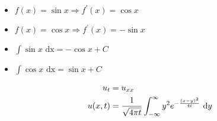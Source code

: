 \documentclass{article}
\begin{document}
\begin{multicols}{2}
\begin{itemize}
  \item $f(x) = \sin x \Rightarrow f^\prime(x) =   \cos x$
  \item $f(x) = \cos x \Rightarrow f^\prime(x) = - \sin x$
  \item $\int \sin x \text{ dx} = - \cos x + C$
  \item $\int \cos x \text{ dx} =   \sin x + C$
\end{itemize}

%
\begin{align}
  u_t & = u_{xx}\\
  u(x, t)
  & = \frac{1}{\sqrt{4 \pi t}} \int^\infty_{-\infty}
  y^2 e^{-\frac{(x - y)^2}{4t}}\ \text dy
\end{align}

\end{multicols}
\end{document}
